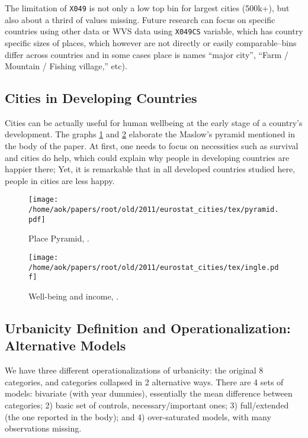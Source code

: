 \documentclass[10pt, letterpaper]{article}
\begin{document}
\begin{spacing}{1.4}
The limitation of \texttt{X049} is not only a low top bin for largest cities
(500k+), but also about a thrird of values missing. Future research can focus on
specific countries using other data or WVS data using \texttt{X049CS} variable,
which has country specific sizes of places, which however are not directly or
easily comparable--bins differ across countries and in some cases place is names
``major city'', ``Farm / Mountain / Fishing village,'' etc). 


\subsection*{Cities in Developing Countries}

Cities can be actually useful for human wellbeing at the early stage of a
country's development. The graphs \ref{pyramid} and \ref{ingle} elaborate the
Maslow's pyramid mentioned in the body of the paper. At first, one needs to
focus on necessities such as survival and cities do help, which could explain
why people in developing countries are happier there; Yet, it is remarkable that
in all developed countries studied here, people in cities are less happy.

\begin{figure}[H]
\begin{centering}
 \texttt{[image: /home/aok/papers/root/old/2011/eurostat\_cities/tex/pyramid.pdf]}
 \caption{Place Pyramid, \citep[p 294]{florida08}.} \label{pyramid}
  \end{centering}
\end{figure}

\begin{figure}[H]
\begin{centering}
 \texttt{[image: /home/aok/papers/root/old/2011/eurostat\_cities/tex/ingle.pdf]}
 \caption{Well-being and income, \citep{inglehart97}.} \label{ingle}
  \end{centering}
\end{figure}


\subsection*{Urbanicity Definition and Operationalization: Alternative Models} 

We have three different operationalizations of urbanicity: the original 8
categories, and categories collapsed in 2 alternative ways. There are 4 sets of
models: bivariate (with year dummies), essentially the mean difference between
categories; 2) basic set of controls, necessary/important ones; 3)
full/extended (the one reported in the body); and 4)  over-saturated models,
with many observations missing. 


\end{spacing}
\end{document}
